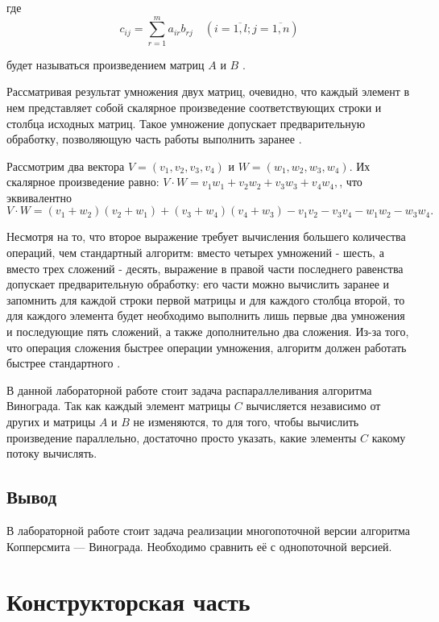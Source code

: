 \documentclass[a4paper,14pt]{extreport}
\begin{document}
где
\begin{equation}
	\label{eq:M}
	c_{ij} =
	\sum_{r=1}^{m} a_{ir}b_{rj} \quad (i=\overline{1,l}; j=\overline{1,n})
\end{equation}

будет называться произведением матриц $A$ и $B$ \cite{Cohn}.

Рассматривая результат умножения двух матриц, очевидно, что каждый элемент в нем представляет собой скалярное произведение соответствующих строки и столбца исходных матриц.
Такое умножение допускает предварительную обработку, позволяющую часть работы выполнить заранее \cite{Coppersmith}.

Рассмотрим два вектора $V = (v_1, v_2, v_3, v_4)$ и $W = (w_1, w_2, w_3, w_4)$.
Их скалярное произведение равно: $V\cdot W = v_1w_1 + v_2w_2 + v_3w_3 + v_4w_4,$, что эквивалентно
\begin{equation}
	V\cdot W = (v_1 + w_2)(v_2 + w_1) + (v_3 + w_4)(v_4 + w_3) - v_1v_2 - v_3v_4 - w_1w_2 - w_3w_4.
\end{equation}

Несмотря на то, что второе выражение требует вычисления большего количества операций, чем стандартный алгоритм: вместо четырех умножений - шесть, а вместо трех сложений - десять, выражение в правой части последнего равенства допускает предварительную обработку: его части можно вычислить заранее и запомнить для каждой строки первой матрицы и для каждого столбца второй, то для каждого элемента будет необходимо выполнить лишь первые два умножения и последующие пять сложений, а также дополнительно два сложения.
Из-за того, что операция сложения быстрее операции умножения, алгоритм должен работать быстрее стандартного \cite{Pogorelov}.

В данной лабораторной работе стоит задача распараллеливания алгоритма Винограда.
Так как каждый элемент матрицы $C$ вычисляется независимо от других и матрицы $A$ и $B$ не изменяются, то для того, чтобы вычислить произведение параллельно, достаточно просто указать, какие элементы $C$ какому потоку вычислять.


\section*{Вывод}
В лабораторной работе стоит задача реализации многопоточной версии алгоритма Копперсмита — Винограда.
Необходимо сравнить её с однопоточной версией.


\chapter{Конструкторская часть}
\end{document}
